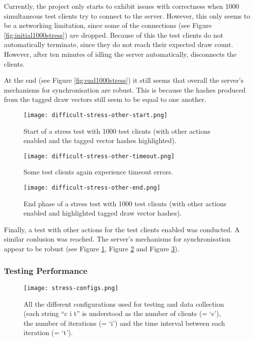 \documentclass[article]{uom-coursework}
\begin{document}
Currently, the project only starts to exhibit issues with
correctness when 1000 simultaneous test clients try to connect
to the server. However, this only seems to be a networking
limitation, since some of the connections (see Figure
\ref{fig:initial1000stress}) are dropped. Because of this the
test clients do not automatically terminate, since they do not
reach their expected draw count. However, after ten minutes of
idling the server automatically, disconnects the clients.

At the end (see Figure \ref{fig:end1000stress}) it still seems
that overall the server's mechanisms for synchronisation are
robust. This is because the hashes produced from the tagged draw
vectors still seem to be equal to one another.

\begin{figure}[H]
\centering
\texttt{[image: difficult-stress-other-start.png]}
\caption{Start of a stress test with 1000 test clients (with
other actions enabled and the tagged vector hashes
highlighted).}
\label{fig:start1000stressother}
\end{figure}

\begin{figure}[H]
\centering
\texttt{[image: difficult-stress-other-timeout.png]}
\caption{Some test clients again experience timeout errors.}
\label{fig:timeout1000stressother}
\end{figure}

\begin{figure}[H]
\centering
\texttt{[image: difficult-stress-other-end.png]}
\caption{End phase of a stress test with 1000 test clients (with
other actions enabled and highlighted tagged draw vector
hashes).}
\label{fig:end1000stressother}
\end{figure}

Finally, a test with other actions for the test clients enabled
was conducted. A similar conlusion was reached. The server's
mechanisms for synchronisation appear to be robust (see Figure
\ref{fig:start1000stressother}, Figure
\ref{fig:timeout1000stressother} and Figure
\ref{fig:end1000stressother}).

\subsubsection{Testing Performance}

\begin{figure}[H]
\centering
\texttt{[image: stress-configs.png]}
\caption{All the different configurations used for testing and
data collection (each string  ``c i t'' is understood as the
number of clients (= `c'), the number of iterations (= `i') and
the time interval between each iteration (= `t').}
\label{fig:stressconfigs}
\end{figure}
\end{document}
